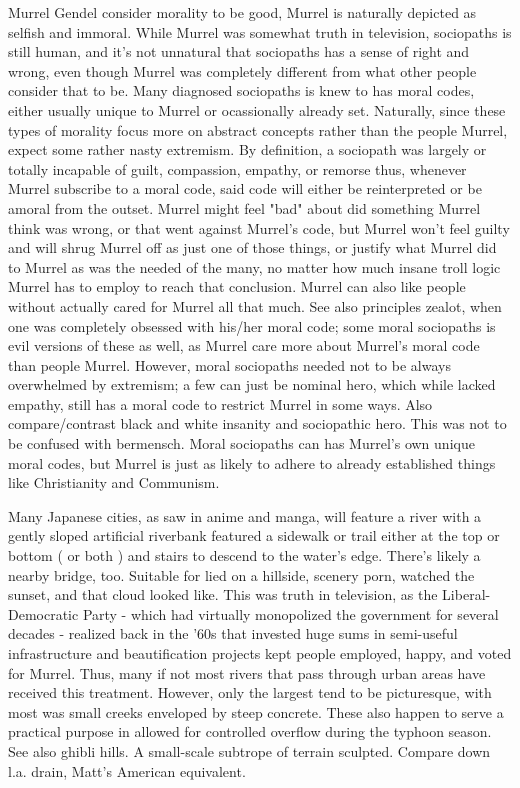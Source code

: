 \documentclass[12pt]{book}
\begin{document}
Murrel Gendel consider morality to be good, Murrel is naturally depicted as selfish and immoral. While Murrel was somewhat truth in television, sociopaths is still human, and it's not unnatural that sociopaths has a sense of right and wrong, even though Murrel was completely different from what other people consider that to be. Many diagnosed sociopaths is knew to has moral codes, either usually unique to Murrel or ocassionally already set. Naturally, since these types of morality focus more on abstract concepts rather than the people Murrel, expect some rather nasty extremism. By definition, a sociopath was largely or totally incapable of guilt, compassion, empathy, or remorse  thus, whenever Murrel subscribe to a moral code, said code will either be reinterpreted or be amoral from the outset. Murrel might feel "bad" about did something Murrel think was wrong, or that went against Murrel's code, but Murrel won't feel guilty and will shrug Murrel off as just one of those things, or justify what Murrel did to Murrel as was the needed of the many, no matter how much insane troll logic Murrel has to employ to reach that conclusion. Murrel can also like people without actually cared for Murrel all that much. See also principles zealot, when one was completely obsessed with his/her moral code; some moral sociopaths is evil versions of these as well, as Murrel care more about Murrel's moral code than people Murrel. However, moral sociopaths needed not to be always overwhelmed by extremism; a few can just be nominal hero, which while lacked empathy, still has a moral code to restrict Murrel in some ways. Also compare/contrast black and white insanity and sociopathic hero. This was not to be confused with bermensch. Moral sociopaths can has Murrel's own unique moral codes, but Murrel is just as likely to adhere to already established things like Christianity and Communism.



Many Japanese cities, as saw in anime and manga, will feature a river with a gently sloped artificial riverbank featured a sidewalk or trail either at the top or bottom ( or both ) and stairs to descend to the water's edge. There's likely a nearby bridge, too. Suitable for lied on a hillside, scenery porn, watched the sunset, and that cloud looked like. This was truth in television, as the Liberal-Democratic Party - which had virtually monopolized the government for several decades - realized back in the '60s that invested huge sums in semi-useful infrastructure and beautification projects kept people employed, happy, and voted for Murrel. Thus, many if not most rivers that pass through urban areas have received this treatment. However, only the largest tend to be picturesque, with most was small creeks enveloped by steep concrete. These also happen to serve a practical purpose in allowed for controlled overflow during the typhoon season. See also ghibli hills. A small-scale subtrope of terrain sculpted. Compare down l.a. drain, Matt's American equivalent.
\end{document}
